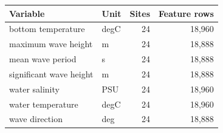 \begin{tabular}{l l r r}
\toprule
Variable & Unit & Sites & Feature rows \\
\midrule
bottom temperature & degC & 24 & 18,960 \\
maximum wave height & m & 24 & 18,888 \\
mean wave period & s & 24 & 18,888 \\
significant wave height & m & 24 & 18,888 \\
water salinity & PSU & 24 & 18,960 \\
water temperature & degC & 24 & 18,960 \\
wave direction & deg & 24 & 18,888 \\
\bottomrule
\end{tabular}